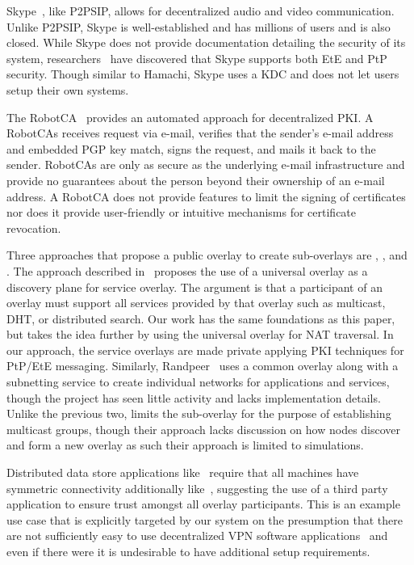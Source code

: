 \documentclass[conference]{IEEEtran}
\begin{document}
Skype~\cite{skype}, like P2PSIP, allows for decentralized audio and video
communication. Unlike P2PSIP, Skype is well-established and has millions
of users and is also closed.  While Skype does not provide documentation
detailing the security of its system, researchers~\cite{skype_auth,
skype_overview} have discovered that Skype supports both EtE and PtP security.
Though similar to Hamachi, Skype uses a KDC and does not let users setup their
own systems.

The RobotCA~\cite{robotca} provides an automated approach for decentralized
PKI.  A RobotCAs receives request via e-mail, verifies that the sender's e-mail
address and embedded PGP key match, signs the request, and mails it back to the
sender.  RobotCAs are only as secure as the underlying e-mail infrastructure
and provide no guarantees about the person beyond their ownership of an e-mail
address.  A RobotCA does not provide features to limit the signing of
certificates nor does it provide user-friendly or intuitive mechanisms for
certificate revocation.

Three approaches that propose a public overlay to create sub-overlays are
\cite{one_ring}, \cite{randpeer}, and \cite{can_multicast}.
The approach described in~\cite{one_ring} proposes the use of a universal overlay as a discovery plane for
service overlay.  The argument is that a participant of an overlay
must support all services provided by that overlay such as multicast, DHT,
or distributed search.  Our work has the same foundations as this paper, but
takes the idea further by using the universal overlay for NAT traversal.
In our approach, the service overlays are made private applying PKI techniques for PtP/EtE messaging.
Similarly, Randpeer~\cite{randpeer} uses a common overlay along with a
subnetting service to create individual networks for applications and services,
though the project has seen little activity and lacks implementation details.
Unlike the previous two, \cite{can_multicast} limits the sub-overlay for the
purpose of establishing multicast groups, though their approach lacks discussion
on how nodes discover and form a new overlay as such their approach is limited
to simulations.

Distributed data store applications like~\cite{dynamo, bigtable} require that
all machines have symmetric connectivity additionally like~\cite{past}, suggesting
the use of a third party application to ensure trust amongst all overlay
participants.  This is an example use case that is explicitly targeted by our
system on the presumption that there are not sufficiently easy to use
decentralized VPN software applications~\cite{sc09, nsdi10} and even if there
were it is undesirable to have additional setup requirements.
\end{document}
